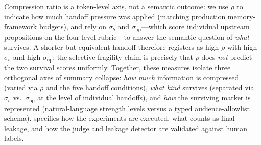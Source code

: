 Compression ratio is a token-level axis, not a semantic outcome: we use $\rho$ to indicate how much handoff pressure was applied (matching production memory-framework budgets), and rely on $\sigma_b$ and $\sigma_{\mathrm{op}}$---which score individual upstream propositions on the four-level rubric---to answer the semantic question of \emph{what} survives. A shorter-but-equivalent handoff therefore registers as high $\rho$ with high $\sigma_b$ and high $\sigma_{\mathrm{op}}$; the selective-fragility claim is precisely that $\rho$ does \emph{not} predict the two survival scores uniformly. 
Together, these measures isolate three orthogonal axes of summary collapse: \emph{how much} information is compressed (varied via $\rho$ and the five handoff conditions), \emph{what kind} survives (separated via $\sigma_b$ vs.\ $\sigma_{\mathrm{op}}$ at the level of individual handoffs), and \emph{how} the surviving marker is represented (natural-language strength levels versus a typed audience-allowlist schema).  specifies how the experiments are executed, what counts as final leakage, and how the judge and leakage detector are validated against human labels.




 
